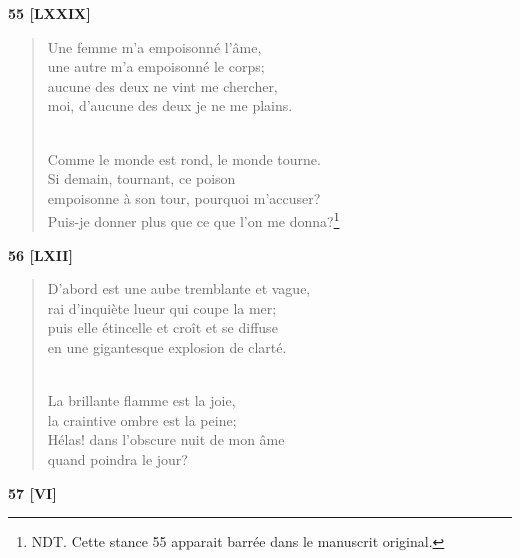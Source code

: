 \documentclass[a4paper,11pt]{book}
\begin{document}
\bigskip

\begin{center} {\bf 55 [LXXIX]} \end{center}

\begin{verse}
Une femme m'a empoisonné l'âme, \\
une autre m'a empoisonné le corps; \\
aucune des deux ne vint me chercher, \\
moi, d'aucune des deux je ne me plains. \\ \

Comme le monde est rond, le monde tourne. \\
Si demain, tournant, ce poison \\
empoisonne à son tour, pourquoi m'accuser? \\
Puis-je donner plus que ce que l'on me donna?\footnote{NDT. Cette stance 55 apparait barrée dans le manuscrit original.} \\
\end{verse}

\bigskip

\begin{center} {\bf 56 [LXII]} \end{center}

\begin{verse}
D'abord est une aube tremblante et vague, \\
rai d'inquiète lueur qui coupe la mer; \\
puis elle étincelle et croît et se diffuse \\
en une gigantesque explosion de clarté. \\ \

La brillante flamme est la joie, \\
la craintive ombre est la peine; \\
Hélas! dans l'obscure nuit de mon âme \\
quand poindra le jour? \\
\end{verse}

\bigskip

\begin{center} {\bf 57 [VI]} \end{center}
\end{document}

